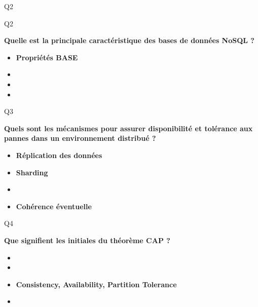 {\begin{frame}{Q2}
\end{frame}

\begin{frame}{Q2}

    \textbf{Quelle est la principale caractéristique des bases de données NoSQL ?}

    \begin{itemize}
        \item \textbf<2>{\textcolor{kh-red}{Propriétés BASE}}
        \item {}
        \item {}
        \item {}
    \end{itemize}

\end{frame}

\begin{frame}{Q3}

    \textbf{Quels sont les mécanismes pour assurer disponibilité et tolérance aux pannes dans un environnement distribué ?}

    \begin{itemize}
        \item \textbf<2>{\textcolor{kh-red}{Réplication des données}}
        \item \textbf<2>{\textcolor{kh-blue}{Sharding}}
        \item {}
        \item \textbf<2>{\textcolor{kh-yellow}{Cohérence éventuelle}}
    \end{itemize}

\end{frame}

\begin{frame}{Q4}

    \textbf{Que signifient les initiales du théorème CAP ?}

    \begin{itemize}
        \item {}
        \item {}
        \item \textbf<2>{\textcolor{kh-green}{Consistency, Availability, Partition Tolerance}}
        \item {}
    \end{itemize}


\end{frame}}
